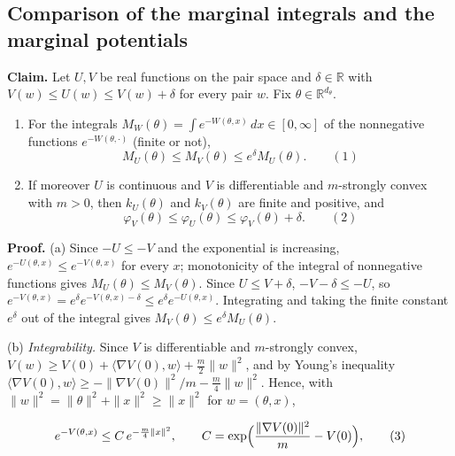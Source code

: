 \documentclass[11pt,a4paper]{report}
\begin{document}
\subsection{\texorpdfstring{Comparison of the marginal integrals and the marginal potentials}{Comparison of the marginal integrals and the marginal potentials}}
\label{report-step-ProximalLangevin-Perturbation-lean-2}


\textbf{Claim.} Let \(U,V\) be real functions on the pair space and \(\delta\in\mathbb R\) with \(V(w)\le U(w)\le V(w)+\delta\) for every pair \(w\). Fix \(\theta\in\mathbb R^{d_\theta}\).



\begin{enumerate}


\item For the integrals \(M_W(\theta)=\int e^{-W(\theta,x)}\,dx\in[0,\infty]\) of the nonnegative functions \(e^{-W(\theta,\cdot)}\) (finite or not),
\[M_U(\theta)\le M_V(\theta)\le e^\delta M_U(\theta).\qquad(1)\]

\item If moreover \(U\) is continuous and \(V\) is differentiable and \(m\)-strongly convex with \(m>0\), then \(k_U(\theta)\) and \(k_V(\theta)\) are finite and positive, and
\[\varphi_V(\theta)\le\varphi_U(\theta)\le\varphi_V(\theta)+\delta.\qquad(2)\]

\end{enumerate}



\textbf{Proof.} (a) Since \(-U\le-V\) and the exponential is increasing, \(e^{-U(\theta,x)}\le e^{-V(\theta,x)}\) for every \(x\); monotonicity of the integral of nonnegative functions gives \(M_U(\theta)\le M_V(\theta)\). Since \(U\le V+\delta\), \(-V-\delta\le-U\), so \(e^{-V(\theta,x)}=e^\delta e^{-V(\theta,x)-\delta}\le e^\delta e^{-U(\theta,x)}\). Integrating and taking the finite constant \(e^\delta\) out of the integral gives \(M_V(\theta)\le e^\delta M_U(\theta)\).




(b) \emph{Integrability.} Since \(V\) is differentiable and \(m\)-strongly convex, \(V(w)\ge V(0)+\langle\nabla V(0),w\rangle+\frac m2\|w\|^2\), and by Young's inequality \(\langle\nabla V(0),w\rangle\ge-\|\nabla V(0)\|^2/m-\frac m4\|w\|^2\). Hence, with \(\|w\|^2=\|\theta\|^2+\|x\|^2\ge\|x\|^2\) for \(w=(\theta,x)\),


\[e^{-V(\theta,x)}\le C\,e^{-\frac m4\|x\|^2},\qquad C=\exp\Bigl(\frac{\|\nabla V(0)\|^2}{m}-V(0)\Bigr),\qquad(3)\]
\end{document}
